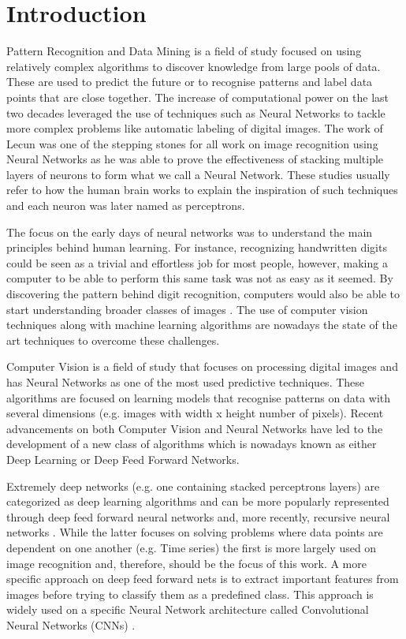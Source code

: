 \chapter{Introduction}
Pattern Recognition and Data Mining is a field of study focused on using relatively complex algorithms to discover knowledge from large pools of data. These are used to predict the future or to recognise patterns and label data points that are close together. The increase of computational power on the last two decades leveraged the use of techniques such as Neural Networks \cite{bishop1995neural} to tackle more complex problems like automatic labeling of digital images. The work of Lecun \cite{lecunn89} was one of the stepping stones for all work on image recognition using Neural Networks as he was able to prove the effectiveness of stacking multiple layers of neurons to form what we call a Neural Network. These studies usually refer to how the human brain works to explain the inspiration of such techniques and each neuron was later named as perceptrons.

The focus on the early days of neural networks was to understand the main principles behind human learning. For instance, recognizing handwritten digits could be seen as a trivial and effortless job for most people, however, making a computer to be able to perform this same task was not as easy as it seemed. By discovering the pattern behind digit recognition, computers would also be able to start understanding broader classes of images \cite{krizhevsky2012}. The use of computer vision techniques along with machine learning algorithms are nowadays the state of the art techniques to overcome these challenges.

Computer Vision is a field of study that focuses on processing digital images and has Neural Networks as one of the most used predictive techniques. These algorithms are focused on learning models that recognise patterns on data with several dimensions (e.g. images with width x height number of pixels). Recent advancements on both Computer Vision and Neural Networks have led to the development of a new class of algorithms which is nowadays known as either Deep Learning or Deep Feed Forward Networks.

Extremely deep networks (e.g. one containing stacked perceptrons layers) are categorized as deep learning algorithms and can be more popularly represented through deep feed forward neural networks \cite{hornik1989multilayer} and, more recently, recursive neural networks \cite{goller1996learning}. While the latter focuses on solving problems where data points are dependent on one another (e.g. Time series) the first is more largely used on image recognition and, therefore, should be the focus of this work. A more specific approach on deep feed forward nets is to extract important features from images before trying to classify them as a predefined class. This approach is widely used on a specific Neural Network architecture called Convolutional Neural Networks (CNNs) \cite{matsugu2003subject}.

